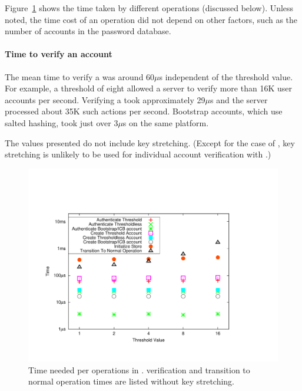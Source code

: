 Figure~\ref{FIGURE:running-times} shows the time taken by different
operations (discussed below). Unless noted, the time cost of an operation did
not depend on other factors, such as the number of accounts in the password
database.

\paragraph{Time to verify an account} The mean time to verify a
\thresholdaccount was around 60$\mu$s independent of the threshold value.
For example, a threshold of eight allowed a server to verify more than 16K user
accounts per second.  Verifying a \thresholdlessaccount took approximately 29$\mu$s
and the server processed about 35K such actions per second. Bootstrap accounts,
which use salted hashing, took just over 3$\mu$s on the same platform.

The values presented do not include key stretching.  (Except for
the case of \partialverification, key stretching is unlikely to be used
for individual account verification with \PPH.)  


\begin{figure}
    \centering
    \includegraphics[width=.5\linewidth, trim=205 65 280 105]{./images/pph-running-times.pdf}
    \caption{Time needed per operations in \PPH. 
    \Partialbytes verification and transition to 
normal operation times are listed without key stretching.   }
    \label{FIGURE:running-times}
\end{figure}


